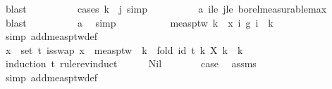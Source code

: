 \begin{isabellebody}
\ blast\isanewline
\ \ \ \ \ \ \ \ \isamarkupfalse%
\ {\isacharparenleft}{\kern0pt}cases\ {\isachardoublequoteopen}k\ {\isacharequal}{\kern0pt}\ j{\isachardoublequoteclose}{\isacharcomma}{\kern0pt}\ simp{\isacharparenright}{\kern0pt}\isanewline
\ \ \ \ \ \ \ \ \isamarkupfalse%
\ a\ i{\isacharunderscore}{\kern0pt}le\ j{\isacharunderscore}{\kern0pt}le\ borel{\isacharunderscore}{\kern0pt}measurable{\isacharunderscore}{\kern0pt}max\ \isamarkupfalse%
\ blast\isanewline
\ \ \ \ \ \ \ \ \isamarkupfalse%
\ a\ \isamarkupfalse%
\ simp\isanewline
\ \ \ \ \isamarkupfalse%
\isanewline
\ \ \ \ \isamarkupfalse%
\ {\isachardoublequoteopen}meas{\isacharunderscore}{\kern0pt}ptw\ {\isacharparenleft}{\kern0pt}{\isasymlambda}k\ {\isasymomega}{\isachardot}{\kern0pt}\ x\ {\isacharparenleft}{\kern0pt}{\isasymlambda}i{\isachardot}{\kern0pt}\ g\ i\ {\isasymomega}{\isacharparenright}{\kern0pt}\ k{\isacharparenright}{\kern0pt}{\isachardoublequoteclose}\ \isanewline
\ \ \ \ \ \ \isamarkupfalse%
\ {\isacharparenleft}{\kern0pt}simp\ add{\isacharcolon}{\kern0pt}meas{\isacharunderscore}{\kern0pt}ptw{\isacharunderscore}{\kern0pt}def{\isacharparenright}{\kern0pt}\isanewline
\ \ \isamarkupfalse%
\isanewline
\isanewline
\ \ \isamarkupfalse%
\ {\isachardoublequoteopen}{\isacharparenleft}{\kern0pt}{\isasymforall}x\ {\isasymin}\ set\ t{\isachardot}{\kern0pt}\ is{\isacharunderscore}{\kern0pt}swap\ x{\isacharparenright}{\kern0pt}\ {\isasymLongrightarrow}\ meas{\isacharunderscore}{\kern0pt}ptw\ {\isacharparenleft}{\kern0pt}{\isasymlambda}\ k\ {\isasymomega}{\isachardot}{\kern0pt}\ {\isacharparenleft}{\kern0pt}fold\ id\ t\ {\isacharparenleft}{\kern0pt}{\isasymlambda}k{\isachardot}{\kern0pt}\ X\ k\ {\isasymomega}{\isacharparenright}{\kern0pt}{\isacharparenright}{\kern0pt}\ k{\isacharparenright}{\kern0pt}{\isachardoublequoteclose}\isanewline
\ \ \isamarkupfalse%
\ {\isacharparenleft}{\kern0pt}induction\ t\ rule{\isacharcolon}{\kern0pt}rev{\isacharunderscore}{\kern0pt}induct{\isacharparenright}{\kern0pt}\isanewline
\ \ \ \ \isamarkupfalse%
\ Nil\isanewline
\ \ \ \ \isamarkupfalse%
\ \isamarkupfalse%
\ {\isacharquery}{\kern0pt}case\ \isamarkupfalse%
\ assms\ \isamarkupfalse%
\ {\isacharparenleft}{\kern0pt}simp\ add{\isacharcolon}{\kern0pt}meas{\isacharunderscore}{\kern0pt}ptw{\isacharunderscore}{\kern0pt}def{\isacharparenright}{\kern0pt}\isanewline

\end{isabellebody}
